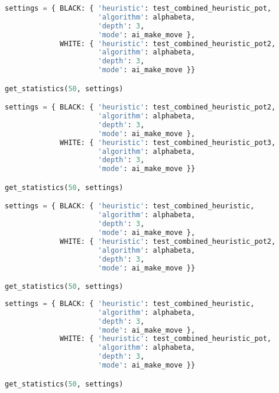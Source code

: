 \begin{lstlisting}[language=Python]
settings = { BLACK: { 'heuristic': test_combined_heuristic_pot,
                      'algorithm': alphabeta,
                      'depth': 3,
                      'mode': ai_make_move },
             WHITE: { 'heuristic': test_combined_heuristic_pot2,
                      'algorithm': alphabeta,
                      'depth': 3,
                      'mode': ai_make_move }}

get_statistics(50, settings)

settings = { BLACK: { 'heuristic': test_combined_heuristic_pot2,
                      'algorithm': alphabeta,
                      'depth': 3,
                      'mode': ai_make_move },
             WHITE: { 'heuristic': test_combined_heuristic_pot3,
                      'algorithm': alphabeta,
                      'depth': 3,
                      'mode': ai_make_move }}

get_statistics(50, settings)

settings = { BLACK: { 'heuristic': test_combined_heuristic,
                      'algorithm': alphabeta,
                      'depth': 3,
                      'mode': ai_make_move },
             WHITE: { 'heuristic': test_combined_heuristic_pot2,
                      'algorithm': alphabeta,
                      'depth': 3,
                      'mode': ai_make_move }}

get_statistics(50, settings)
\end{lstlisting}

\begin{lstlisting}[language=Python]
settings = { BLACK: { 'heuristic': test_combined_heuristic,
                      'algorithm': alphabeta,
                      'depth': 3,
                      'mode': ai_make_move },
             WHITE: { 'heuristic': test_combined_heuristic_pot,
                      'algorithm': alphabeta,
                      'depth': 3,
                      'mode': ai_make_move }}

get_statistics(50, settings)
\end{lstlisting}

